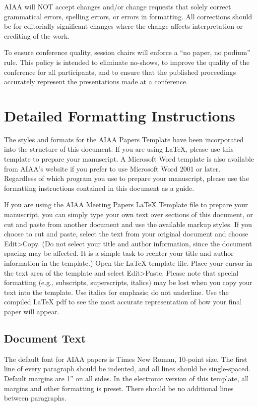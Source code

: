 \documentclass[conf]{new-aiaa}
\begin{document}
AIAA will NOT accept changes and/or change requests that solely correct grammatical errors, spelling errors, or errors in formatting.  All corrections should be for editorially significant changes where the change affects interpretation or crediting of the work.

To ensure conference quality, session chairs will enforce a ``no paper, no podium'' rule. This policy is intended to eliminate no-shows, to improve the quality of the conference for all participants, and to ensure that the published proceedings accurately represent the presentations made at a conference.

\section{Detailed Formatting Instructions}

The styles and formats for the AIAA Papers Template have been incorporated into the structure of this document. If you are using \LaTeX{}, please use this template to prepare your manuscript. A Microsoft Word template is also available from AIAA's website if you prefer to use Microsoft Word 2001 or later. Regardless of which program you use to prepare your manuscript, please use the formatting instructions contained in this document as a guide.

If you are using the AIAA Meeting Papers \LaTeX{} Template file to prepare your manuscript, you can simply type your own text over sections of this document, or cut and paste from another document and use the available markup styles. If you choose to cut and paste, select the text from your original document and choose Edit>Copy. (Do not select your title and author information, since the document spacing may be affected. It is a simple task to reenter your title and author information in the template.) Open the \LaTeX{} template file. Place your cursor in the text area of the template and select Edit>Paste. Please note that special formatting (e.g., subscripts, superscripts, italics) may be lost when you copy your text into the template. Use italics for emphasis; do not underline. Use the compiled \LaTeX{} pdf to see the most accurate representation of how your final paper will appear.

\subsection{Document Text}
The default font for AIAA papers is Times New Roman, 10-point size.  The first line of every paragraph should be indented, and all lines should be single-spaced. Default margins are 1'' on all sides. In the electronic version of this template, all margins and other formatting is preset. There should be no additional lines between paragraphs.
\end{document}
